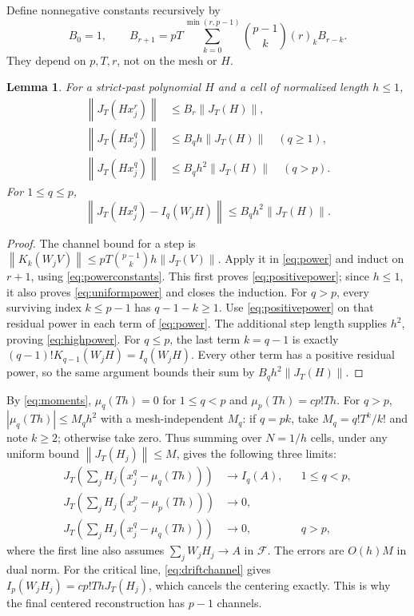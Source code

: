 \documentclass[11pt]{article}
\newtheorem{lemma}[theorem]{Lemma}
\theoremstyle{remark}\newtheorem{remark}[theorem]{Remark}
\newcommand{\norm}[1]{\left\lVert#1\right\rVert}
\begin{document}
Define nonnegative constants recursively by
\begin{equation}\label{eq:powerconstants}
 B_0=1,\qquad B_{r+1}=pT\sum_{k=0}^{\min(r,p-1)}
 \binom{p-1}{k}(r)_k B_{r-k}.
\end{equation}
They depend on $p,T,r$, not on the mesh or $H$.

\begin{lemma}\label{lem:powerbounds}
For a strict-past polynomial $H$ and a cell of normalized length
$h\leq1$,
\begin{align}
 \norm{J_T(Hx_j^r)}&\leq B_r\norm{J_T(H)},\label{eq:uniformpower}\\
 \norm{J_T(Hx_j^q)}&\leq B_qh\norm{J_T(H)}\quad(q\geq1),\label{eq:positivepower}\\
 \norm{J_T(Hx_j^q)}&\leq B_qh^2\norm{J_T(H)}\quad(q>p).\label{eq:highpower}
\end{align}
For $1\leq q\leq p$,
\begin{equation}\label{eq:powererror}
 \norm{J_T(Hx_j^q)-I_q(W_jH)}
 \leq B_qh^2\norm{J_T(H)}.
\end{equation}
\end{lemma}
\begin{proof}
The channel bound for a step is
$\norm{K_k(W_jV)}\leq pT\binom{p-1}{k}h\norm{J_T(V)}$.
Apply it in \eqref{eq:power} and induct on $r+1$, using
\eqref{eq:powerconstants}. This first proves
\eqref{eq:positivepower}; since $h\leq1$, it also proves
\eqref{eq:uniformpower} and closes the induction.
For $q>p$, every surviving index $k\leq p-1$ has $q-1-k\geq1$.
Use \eqref{eq:positivepower} on that residual power in each term
of \eqref{eq:power}. The additional step length supplies $h^2$,
proving \eqref{eq:highpower}.
For $q\leq p$, the last term $k=q-1$ is exactly
$(q-1)!K_{q-1}(W_jH)=I_q(W_jH)$.
Every other term has a positive residual power, so the same
argument bounds their sum by $B_qh^2\norm{J_T(H)}$.
\end{proof}

By \eqref{eq:moments}, $\mu_q(Th)=0$ for $1\leq q<p$ and
$\mu_p(Th)=cp!Th$. For $q>p$, $|\mu_q(Th)|\leq M_qh^2$
with a mesh-independent $M_q$: if $q=pk$, take
$M_q=q!T^k/k!$ and note $k\geq2$; otherwise take zero.
Thus summing over $N=1/h$ cells, under any uniform bound
$\norm{J_T(H_j)}\leq M$, gives the following three limits:
\begin{align}
 J_T\left(\sum_jH_j(x_j^q-\mu_q(Th))\right)
 &\longrightarrow I_q(A),&&1\leq q<p,\label{eq:lowl}\\
 J_T\left(\sum_jH_j(x_j^p-\mu_p(Th))\right)
 &\longrightarrow0,\label{eq:criticall}\\
 J_T\left(\sum_jH_j(x_j^q-\mu_q(Th))\right)
 &\longrightarrow0,&&q>p,\label{eq:highl}
\end{align}
where the first line also assumes $\sum_jW_jH_j\to A$ in
$\mathcal F$. The errors are $O(h)M$ in dual norm.
For the critical line, \eqref{eq:driftchannel} gives
$I_p(W_jH_j)=cp!ThJ_T(H_j)$, which cancels the centering exactly.
This is why the final centered reconstruction has $p-1$ channels.
\end{document}
